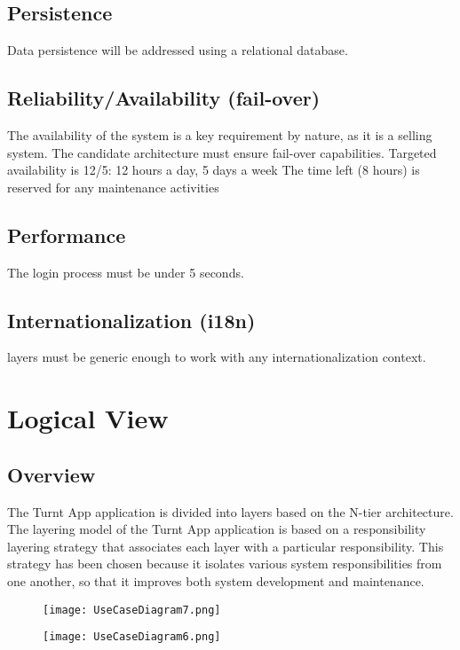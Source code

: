 \documentclass[10pt,a4paper]{article}
\begin{document}
\subsection{Persistence }

Data persistence will be addressed using a relational database. 

\subsection{Reliability/Availability (fail-over)}

The availability of the system is a key requirement by nature, as it is a selling system. The candidate architecture must ensure fail-over capabilities.
Targeted availability is 12/5: 12 hours a day, 5 days a week 
The time left (8 hours) is reserved for any maintenance activities


\subsection{Performance}

The login process must be under 5 seconds.

\subsection{Internationalization (i18n)}
layers must be generic enough to work with any internationalization context.

\section{Logical View}
\subsection{Overview}
The Turnt App application is divided into layers based on the N-tier architecture.\\
The layering model of the Turnt App application is based on a responsibility layering strategy that associates each layer with a particular responsibility.
This strategy has been chosen because it isolates various system responsibilities from one another, so that it improves both system development and maintenance.
\begin{figure}[H]
\texttt{[image: UseCaseDiagram7.png]}
\end{figure}
\begin{figure}[H]
\texttt{[image: UseCaseDiagram6.png]}
\end{figure}
\end{document}
